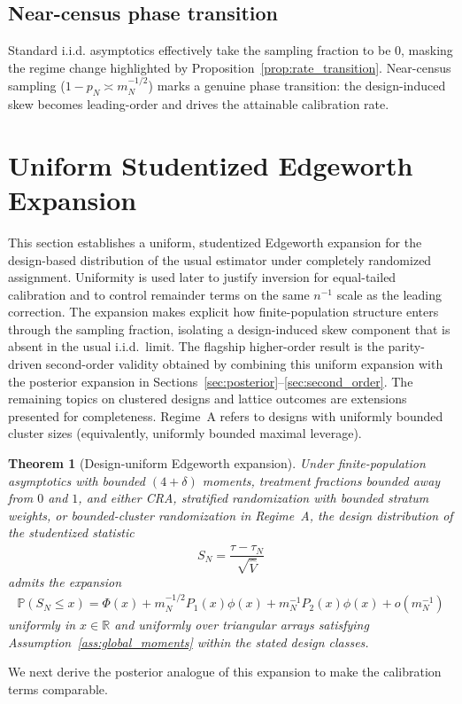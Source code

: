 \documentclass[aos]{imsart}
\newtheorem{theorem}{Theorem}
\theoremstyle{definition}
\theoremstyle{plain}
\newcommand{\Prb}{\mathbb{P}}
\newcommand{\PhiN}{\Phi}
\newcommand{\phiN}{\phi}
\newcommand{\mN}{m_N}
\newcommand{\R}{\mathbb{R}}
\newcommand{\SN}{S_N}
\begin{document}
\subsection*{Near-census phase transition}
Standard i.i.d. asymptotics effectively take the sampling fraction to be $0$, masking the regime change highlighted by
Proposition~\ref{prop:rate_transition}. Near-census sampling ($1-p_N\asymp \mN^{-1/2}$) marks a genuine phase transition:
the design-induced skew becomes leading-order and drives the attainable calibration rate.

\section{Uniform Studentized Edgeworth Expansion}\label{sec:edgeworth}
This section establishes a uniform, studentized Edgeworth expansion for the design-based distribution of the usual estimator under completely randomized assignment.
Uniformity is used later to justify inversion for equal-tailed calibration and to control remainder terms on the same $n^{-1}$ scale as the leading correction.
The expansion makes explicit how finite-population structure enters through the sampling fraction, isolating a design-induced skew component that is absent in the usual i.i.d.\ limit.
\medskip
The flagship higher-order result is the parity-driven second-order validity obtained by combining this uniform expansion
with the posterior expansion in Sections~\ref{sec:posterior}--\ref{sec:second_order}. The remaining topics on clustered
designs and lattice outcomes are extensions presented for completeness.
Regime~A refers to designs with uniformly bounded cluster sizes (equivalently, uniformly bounded maximal leverage).

\begin{theorem}[Design-uniform Edgeworth expansion]\label{thm:edgeworth}
Under finite-population asymptotics with bounded $(4+\delta)$ moments, treatment fractions bounded away from $0$ and $1$, and either CRA, stratified randomization with bounded stratum weights, or bounded-cluster randomization in Regime~A, the design distribution of the studentized statistic
\[
\SN = \frac{\hat\tau-\tau_N}{\sqrt{\hat V}}
\]
admits the expansion
\begin{align*}
\Prb(\SN \le x)
=
\PhiN(x)
+ \mN^{-1/2} P_1(x)\phiN(x)
+ \mN^{-1} P_2(x)\phiN(x)
+ o(\mN^{-1})
\end{align*}
uniformly in $x\in\R$ and uniformly over triangular arrays satisfying Assumption~\ref{ass:global_moments} within the stated design classes.
\end{theorem}
We next derive the posterior analogue of this expansion to make the calibration terms comparable.
\end{document}
